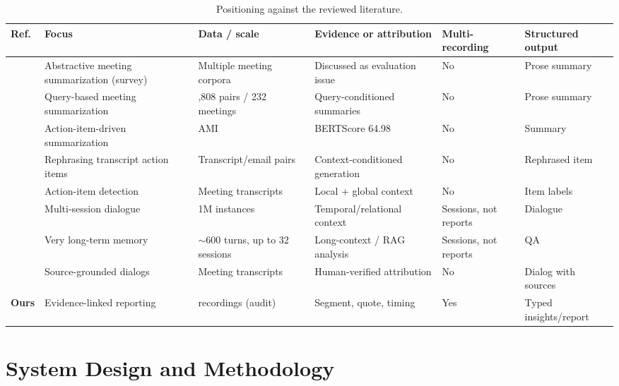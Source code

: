 \documentclass[conference,a4paper]{IEEEtran}
\begin{document}
\begin{table}[t]
\centering
\caption{Positioning against the reviewed literature.}
\label{tab:related}
\setlength{\tabcolsep}{5pt}
\footnotesize
\renewcommand{\arraystretch}{1.15}
\begin{tabular}{@{}>{\raggedright\arraybackslash}p{0.9cm}>{\raggedright\arraybackslash}p{3.3cm}>{\raggedright\arraybackslash}p{3.3cm}>{\raggedright\arraybackslash}p{3.1cm}>{\raggedright\arraybackslash}p{2.4cm}>{\raggedright\arraybackslash}p{2.2cm}@{}}
\toprule
Ref. & Focus & Data / scale & Evidence or attribution & Multi-recording & Structured output \\
\midrule
\cite{rennard2023abstractive} & Abstractive meeting summarization (survey) & Multiple meeting corpora & Discussed as evaluation issue & No & Prose summary \\
\cite{zhong2021qmsum} & Query-based meeting summarization & 1,808 pairs / 232 meetings & Query-conditioned summaries & No & Prose summary \\
\cite{golia2023action} & Action-item-driven summarization & AMI & BERTScore 64.98 & No & Summary \\
\cite{cohen2021rephrasing} & Rephrasing transcript action items & Transcript/email pairs & Context-conditioned generation & No & Rephrased item \\
\cite{liu2023action} & Action-item detection & Meeting transcripts & Local + global context & No & Item labels \\
\cite{jang2023conversation} & Multi-session dialogue & 1M instances & Temporal/relational context & Sessions, not reports & Dialogue \\
\cite{maharana2024locomo} & Very long-term memory & $\sim$600 turns, up to 32 sessions & Long-context / RAG analysis & Sessions, not reports & QA \\
\cite{golany2024mised} & Source-grounded dialogs & Meeting transcripts & Human-verified attribution & No & Dialog with sources \\
\textbf{Ours} & Evidence-linked reporting & 8 recordings (audit) & Segment, quote, timing & Yes & Typed insights/report \\
\bottomrule
\end{tabular}
\end{table}

\section{System Design and Methodology}
\end{document}
